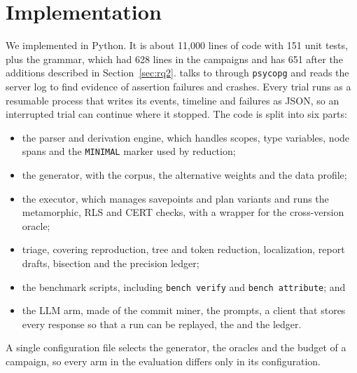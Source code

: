 \section{Implementation}
\label{sec:impl}

We implemented \tool in Python. It is about 11{,}000 lines of code with 151 unit
tests, plus the grammar, which had 628 lines in the campaigns and has 651 after
the additions described in Section~\ref{sec:rq2}. \tool talks to \pg through
\texttt{psycopg} and reads the server log to find evidence of assertion
failures and crashes. Every trial runs as a resumable process that writes its
events, timeline and failures as JSON, so an interrupted trial can continue
where it stopped. The code is split into six parts:
\begin{itemize}
  \item the \pgg parser and derivation engine, which handles scopes, type
    variables, node spans and the \texttt{MINIMAL} marker used by reduction;
  \item the generator, with the corpus, the alternative weights and the data
    profile;
  \item the executor, which manages savepoints and plan variants and runs the
    metamorphic, RLS and CERT checks, with a wrapper for the cross-version
    oracle;
  \item triage, covering reproduction, tree and token reduction, localization,
    report drafts, bisection and the precision ledger;
  \item the benchmark scripts, including \texttt{bench verify} and
    \texttt{bench attribute}; and
  \item the LLM arm, made of the commit miner, the prompts, a client that stores
    every response so that a run can be replayed, the \gate and the ledger.
\end{itemize}
A single configuration file selects the generator, the oracles and the budget of
a campaign, so every arm in the evaluation differs only in its configuration.
